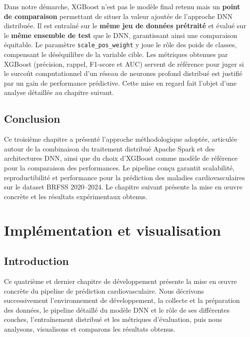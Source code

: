 \documentclass[12pt,a4paper]{report}
\begin{document}
Dans notre démarche, \acs{XGBoost} n'est pas le modèle final retenu mais un
\textbf{point de comparaison} permettant de situer la valeur ajoutée de l'approche
\acs{DNN} distribuée. Il est entraîné sur le \textbf{même jeu de données prétraité}
et évalué sur le \textbf{même ensemble de test} que le \acs{DNN}, garantissant ainsi
une comparaison équitable. Le paramètre \texttt{scale\_pos\_weight} y joue le rôle
des poids de classes, compensant le déséquilibre de la variable cible. Les métriques
obtenues par \acs{XGBoost} (précision, rappel, F1-score et \acs{AUC}) servent de
référence pour juger si le surcoût computationnel d'un réseau de neurones profond
distribué est justifié par un gain de performance prédictive. Cette mise en regard
fait l'objet d'une analyse détaillée au chapitre suivant.

\section*{Conclusion}

Ce troisième chapitre a présenté l'approche méthodologique adoptée, articulée
autour de la combinaison du traitement distribué Apache Spark et des architectures
\acs{DNN}, ainsi que du choix d'\acs{XGBoost} comme modèle de référence pour la
comparaison des performances. Le pipeline conçu garantit scalabilité, reproductibilité et performance
pour la prédiction des maladies cardiovasculaires sur le dataset \acs{BRFSS}
2020--2024. Le chapitre suivant présente la mise en \oe{}uvre concrète et les
résultats expérimentaux obtenus.

\chapter{Implémentation et visualisation}
\label{chap:impl}

\section*{Introduction}

Ce quatrième et dernier chapitre de développement présente la mise en \oe{}uvre
concrète du pipeline de prédiction cardiovasculaire. Nous décrivons successivement
l'environnement de développement, la collecte et la préparation des données, le
pipeline détaillé du modèle \acs{DNN} et le rôle de ses différentes couches,
l'entraînement distribué et les métriques d'évaluation, puis nous analysons,
visualisons et comparons les résultats obtenus.
\end{document}
